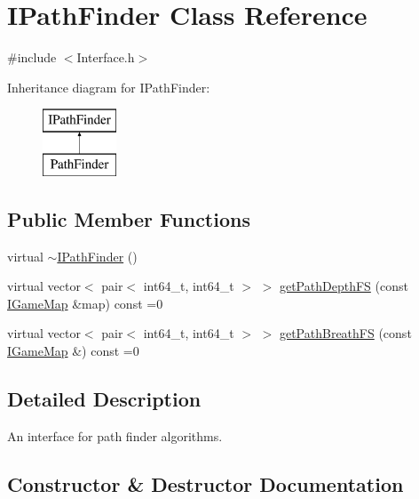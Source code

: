 \hypertarget{class_i_path_finder}{}\section{I\+Path\+Finder Class Reference}
\label{class_i_path_finder}


{\ttfamily \#include $<$Interface.\+h$>$}

Inheritance diagram for I\+Path\+Finder\+:\begin{figure}[H]
\begin{center}
\leavevmode
\includegraphics[height=2.000000cm]{class_i_path_finder}
\end{center}
\end{figure}
\subsection*{Public Member Functions}
\begin{DoxyCompactItemize}
\item 
virtual \hyperlink{class_i_path_finder_a1ca8ee9819bc843eb444a078e599bd13}{$\sim$\+I\+Path\+Finder} ()
\item 
virtual vector$<$ pair$<$ int64\+\_\+t, int64\+\_\+t $>$ $>$ \hyperlink{class_i_path_finder_acf37f7a35ba3d26c3ed019cb952d940c}{get\+Path\+Depth\+F\+S} (const \hyperlink{class_i_game_map}{I\+Game\+Map} \&map) const  =0
\item 
virtual vector$<$ pair$<$ int64\+\_\+t, int64\+\_\+t $>$ $>$ \hyperlink{class_i_path_finder_aee9d3cd450bd391b4586c441f319751d}{get\+Path\+Breath\+F\+S} (const \hyperlink{class_i_game_map}{I\+Game\+Map} \&) const  =0
\end{DoxyCompactItemize}


\subsection{Detailed Description}
An interface for path finder algorithms. 

\subsection{Constructor \& Destructor Documentation}
\hypertarget{class_i_path_finder_a1ca8ee9819bc843eb444a078e599bd13}{}
